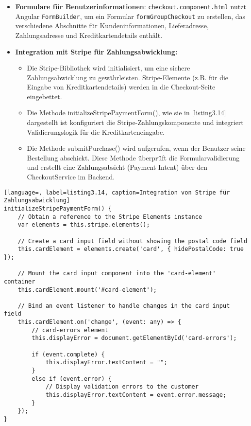 \begin{itemize}
	\item \textbf{Formulare für Benutzerinformationen}:  \verb*|checkout.component.html| nutzt Angular \verb*|FormBuilder|, um ein Formular \verb*|formGroupCheckout| zu erstellen, das verschiedene Abschnitte für Kundeninformationen, Lieferadresse, Zahlungsadresse und Kreditkartendetails enthält.
	\item \textbf{Integration mit Stripe für Zahlungsabwicklung:}
		\begin{itemize}
			\item Die Stripe-Bibliothek wird initialisiert, um eine sichere Zahlungsabwicklung zu gewährleisten. Stripe-Elemente (z.B. für die Eingabe von Kreditkartendetails) werden in die Checkout-Seite eingebettet.
			\item Die Methode initializeStripePaymentForm(), wie sie in \ref{listing3.14} dargestellt ist konfiguriert die Stripe-Zahlungskomponente und integriert Validierungslogik für die Kreditkarteneingabe.
			\item Die Methode submitPurchase() wird aufgerufen, wenn der Benutzer seine Bestellung abschickt. Diese Methode überprüft die Formularvalidierung und erstellt eine Zahlungsabsicht (Payment Intent) über den CheckoutService im Backend.
		\end{itemize}
\end{itemize}
\newpage
\begin{lstlisting}[language=, label=listing3.14, caption=Integration von Stripe für Zahlungsabwicklung]
initializeStripePaymentForm() {
	// Obtain a reference to the Stripe Elements instance
	var elements = this.stripe.elements();
	
	// Create a card input field without showing the postal code field
	this.cardElement = elements.create('card', { hidePostalCode: true });
	
	// Mount the card input component into the 'card-element' container
	this.cardElement.mount('#card-element');

	// Bind an event listener to handle changes in the card input field
	this.cardElement.on('change', (event: any) => {
		// card-errors element
		this.displayError = document.getElementById('card-errors');
		
		if (event.complete) {
			this.displayError.textContent = "";
		} 
		else if (event.error) {
			// Display validation errors to the customer
			this.displayError.textContent = event.error.message;
		}
	});
}
\end{lstlisting}


